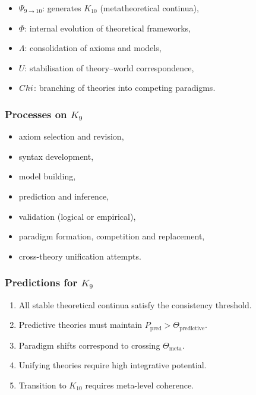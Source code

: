 \begin{itemize}
    \item $\Psi_{9\to10}$: generates $K_{10}$ (metatheoretical continua),
    \item $\Phi$: internal evolution of theoretical frameworks,
    \item $\Lambda$: consolidation of axioms and models,
    \item $U$: stabilisation of theory–world correspondence,
    \item $Chi$: branching of theories into competing paradigms.
\end{itemize}

\subsubsection{Processes on \texorpdfstring{$K_9$}{K_9}}

\begin{itemize}
    \item axiom selection and revision,
    \item syntax development,
    \item model building,
    \item prediction and inference,
    \item validation (logical or empirical),
    \item paradigm formation, competition and replacement,
    \item cross-theory unification attempts.
\end{itemize}

\subsubsection{Predictions for \texorpdfstring{$K_9$}{K_9}}

\begin{enumerate}
    \item All stable theoretical continua satisfy the consistency threshold.
    \item Predictive theories must maintain $P_{\mathrm{pred}} > \Theta_{\mathrm{predictive}}$.
    \item Paradigm shifts correspond to crossing $\Theta_{\mathrm{meta}}$.
    \item Unifying theories require high integrative potential.
    \item Transition to $K_{10}$ requires meta-level coherence.
\end{enumerate}

